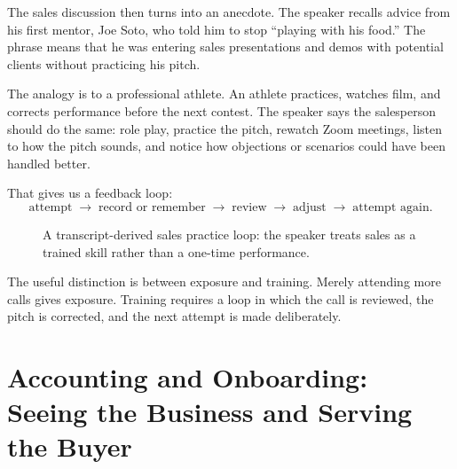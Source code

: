 The sales discussion then turns into an anecdote. The speaker recalls advice from his first mentor, Joe Soto, who told him to stop ``playing with his food.'' The phrase means that he was entering sales presentations and demos with potential clients without practicing his pitch.

The analogy is to a professional athlete. An athlete practices, watches film, and corrects performance before the next contest. The speaker says the salesperson should do the same: role play, practice the pitch, rewatch Zoom meetings, listen to how the pitch sounds, and notice how objections or scenarios could have been handled better.

That gives us a feedback loop:
\[
\text{attempt}
\;\longrightarrow\;
\text{record or remember}
\;\longrightarrow\;
\text{review}
\;\longrightarrow\;
\text{adjust}
\;\longrightarrow\;
\text{attempt again}.
\]

\begin{figure}
\centering
{}
\caption{A transcript-derived sales practice loop: the speaker treats sales as a trained skill rather than a one-time performance.}
\end{figure}

The useful distinction is between exposure and training. Merely attending more calls gives exposure. Training requires a loop in which the call is reviewed, the pitch is corrected, and the next attempt is made deliberately.

\section{Accounting and Onboarding: Seeing the Business and Serving the Buyer}

